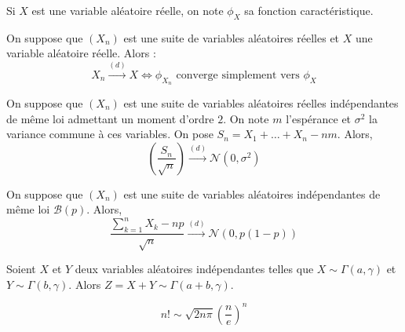  \begin{notation}
    Si $X$ est une variable aléatoire réelle, on note $\phi_X$ sa fonction caractéristique.
  \end{notation}


  \begin{theorem}
    On suppose que $(X_n)$ est une suite de variables aléatoires réelles et $X$ une variable aléatoire réelle. Alors :
    \[ X_n \overset{(d)}{\longrightarrow} X \iff \phi_{X_n} \text{ converge simplement vers } \phi_X \]
  \end{theorem}


  \begin{theorem}
    On suppose que $(X_n)$ est une suite de variables aléatoires réelles indépendantes de même loi admettant un moment d'ordre $2$. On note $m$ l'espérance et $\sigma^2$ la variance commune à ces variables. On pose $S_n = X_1 + \dots + X_n - nm$. Alors,
    \[ \left ( \frac{S_n}{\sqrt{n}} \right) \overset{(d)}{\longrightarrow} \mathcal{N}(0, \sigma^2) \]
  \end{theorem}

  \begin{application}
    On suppose que $(X_n)$ est une suite de variables aléatoires indépendantes de même loi $\mathcal{B}(p)$. Alors,
    \[ \frac{\sum_{k=1}^{n} X_k - np}{\sqrt{n}} \overset{(d)}{\longrightarrow} \mathcal{N}(0, p(1-p)) \]
  \end{application}


  \begin{lemma}
    Soient $X$ et $Y$ deux variables aléatoires indépendantes telles que $X \sim \Gamma(a, \gamma)$ et $Y \sim \Gamma(b, \gamma)$. Alors $Z = X + Y \sim \Gamma(a+b, \gamma)$.
  \end{lemma}


  \begin{application}
    \[ n! \sim \sqrt{2n\pi} \left(\frac{n}{e} \right)^n \]
  \end{application}


